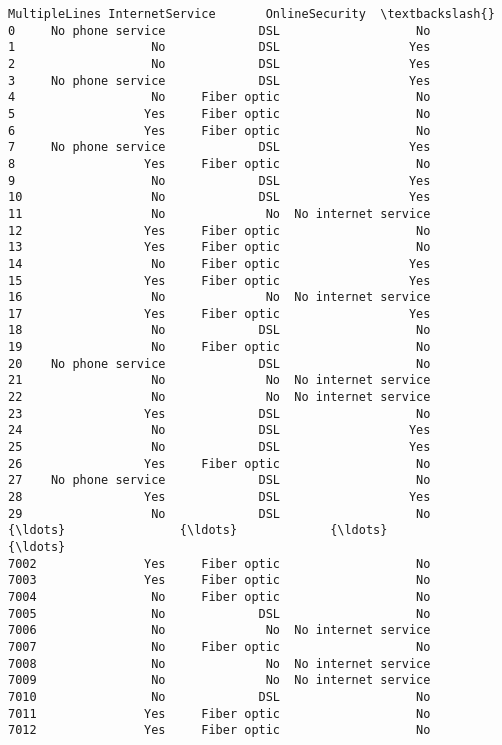 \documentclass[11pt]{article}
\begin{document}
\begin{tcolorbox}[breakable, boxrule=.5pt, size=fbox, pad at break*=1mm, opacityfill=0]
\begin{Verbatim}[commandchars=\\\{\}]
         MultipleLines InternetService       OnlineSecurity  \textbackslash{}
0     No phone service             DSL                   No
1                   No             DSL                  Yes
2                   No             DSL                  Yes
3     No phone service             DSL                  Yes
4                   No     Fiber optic                   No
5                  Yes     Fiber optic                   No
6                  Yes     Fiber optic                   No
7     No phone service             DSL                  Yes
8                  Yes     Fiber optic                   No
9                   No             DSL                  Yes
10                  No             DSL                  Yes
11                  No              No  No internet service
12                 Yes     Fiber optic                   No
13                 Yes     Fiber optic                   No
14                  No     Fiber optic                  Yes
15                 Yes     Fiber optic                  Yes
16                  No              No  No internet service
17                 Yes     Fiber optic                  Yes
18                  No             DSL                   No
19                  No     Fiber optic                   No
20    No phone service             DSL                   No
21                  No              No  No internet service
22                  No              No  No internet service
23                 Yes             DSL                   No
24                  No             DSL                  Yes
25                  No             DSL                  Yes
26                 Yes     Fiber optic                   No
27    No phone service             DSL                   No
28                 Yes             DSL                  Yes
29                  No             DSL                   No
{\ldots}                {\ldots}             {\ldots}                  {\ldots}
7002               Yes     Fiber optic                   No
7003               Yes     Fiber optic                   No
7004                No     Fiber optic                   No
7005                No             DSL                   No
7006                No              No  No internet service
7007                No     Fiber optic                   No
7008                No              No  No internet service
7009                No              No  No internet service
7010                No             DSL                   No
7011               Yes     Fiber optic                   No
7012               Yes     Fiber optic                   No

\end{Verbatim}
\end{tcolorbox}
\end{document}
